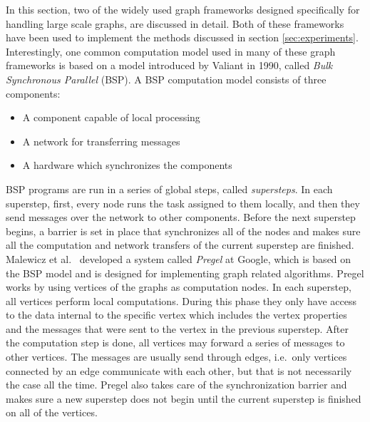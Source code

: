 \documentclass[english]{tktltiki}
\begin{document}
In this section, two of the widely used graph frameworks designed specifically for handling large scale graphs, are discussed in detail. 
Both of these frameworks have been used to implement the methods discussed in section \ref{sec:experiments}. 
Interestingly, one common computation model used in many of these graph frameworks is based on a model introduced by Valiant \cite{valiant90} in 1990, called \textit{Bulk Synchronous Parallel} (BSP). 
A BSP computation model consists of three components: 
\begin{itemize}
\item
A component capable of local processing
\item
A network for transferring messages
\item
A hardware which synchronizes the components
\end{itemize}

BSP programs are run in a series of global steps, called \textit{supersteps}. 
In each superstep, first, every node runs the task assigned to them locally, and then they send messages over the network to other components. 
Before the next superstep begins, a barrier is set in place that synchronizes all of the nodes and makes sure all the computation and network transfers of the current superstep are finished. 
Malewicz et al.\ \cite{malewicz10} developed a system called \textit{Pregel} at Google, which is based on the BSP model and is designed for implementing graph related algorithms. 
Pregel works by using vertices of the graphs as computation nodes.
In each superstep, all vertices perform local computations.
During this phase they only have access to the data internal to the specific vertex which includes the vertex properties and the messages that were sent to the vertex in the previous superstep. 
After the computation step is done, all vertices may forward a series of messages to other vertices. 
The messages are usually send through edges, i.e.\ only vertices connected by an edge communicate with each other, but that is not necessarily the case all the time. 
Pregel also takes care of the synchronization barrier and makes sure a new superstep does not begin until the current superstep is finished on all of the vertices.
\end{document}
